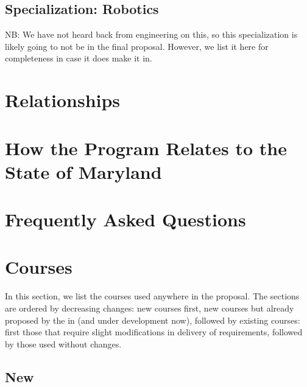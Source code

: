 \documentclass[
10pt, %
a4paper, %
oneside, %
headinclude,footinclude, %
BCOR5mm, %
]{scrartcl}
\begin{document}
\subsection{Specialization: Robotics}

NB: We have not heard back from engineering on this, so this specialization is likely going to not be in the final proposal.  However, we list it here for completeness in case it does make it in. 





\section{Relationships}




\section{How the Program Relates to the State of Maryland}



\section{Frequently Asked Questions}



  \section{Courses}

In this section, we list the courses used anywhere in the proposal.  The sections are ordered by decreasing changes: new courses first, new courses but already proposed by the  in  (and under development now), followed by existing courses: first those that require slight modifications in delivery of requirements, followed by those used without changes.  

  \subsection{New}
\end{document}
